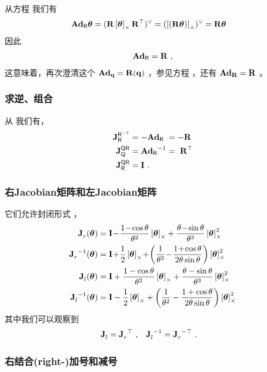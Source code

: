 从方程  我们有
%
\begin{align*}
\Ad{\sR} \bth
&= (\bfR\hatx{\bth}\bfR\tr)^\vee 
= (\hatx{(\bfR\bth)})^\vee 
= \bfR\bth
\end{align*}
%
因此
%
\begin{align}
\Ad{\sR} = \bfR~,
\end{align}
%
这意味着，再次澄清这个 $\Ad[S^3]{\bfq}=\bfR(\bfq)$ ，参见方程 ，还有 $\Ad[\SO(3)]{\bfR}=\bfR$ 。

\subsubsection{求逆、组合}
\label{sec:SO3_inv_comp}

从  我们有，
%
\begin{align}
\mjac{\sR\inv}{\sR} &= -\Ad{\sR} ~= -\bfR \\
\mjac{\sQ\sR}{\sQ} &= \Ad{\sR}\inv = ~\bfR\tr \\
\mjac{\sQ\sR}{\sR} &= \bfI ~.
\end{align}


\subsubsection{右Jacobian矩阵和左Jacobian矩阵}

它们允许封闭形式 \cite[pag.~40]{CHIRIKJIAN-11}，
%
\begin{align}
\mjac{}{r}(\bth) &= \bfI \!-\! \frac{1\!-\!\cos\theta}{\theta^2}\hatx{\bth} + \frac{\theta\!-\!\sin\theta}{\theta^3}\hatx{\bth}^2\\
\mjac{}{r}\inv(\bth) &= \bfI \!+\! \frac12\hatx{\bth} \!+\! \left(\frac{1}{\theta^2} \!-\! \frac{1\!+\!\cos\theta}{2\theta\sin\theta}\right)\hatx{\bth}^2 \\
\mjac{}{l}(\bth) &= \bfI + \frac{1-\cos\theta}{\theta^2}\hatx{\bth} + \frac{\theta-\sin\theta}{\theta^3}\hatx{\bth}^2 \label{equ:SO3_Jl} \\
\mjac{}{l}\inv(\bth) &= \bfI - \frac12\hatx{\bth} + \left(\frac1{\theta^2} - \frac{1+\cos\theta}{2\theta\sin\theta}\right)\hatx{\bth}^2 \label{equ:SO3_Jl_inv}
\end{align}
%
其中我们可以观察到
%
\begin{align}
\mjac{}{l} &= \mjac{}{r}\tr 
~,
&
\mjac{}{l}\inv &= \mjac{}{r}^{-\top}
~.
\end{align}

\subsubsection{右结合(right-)加号和减号}


